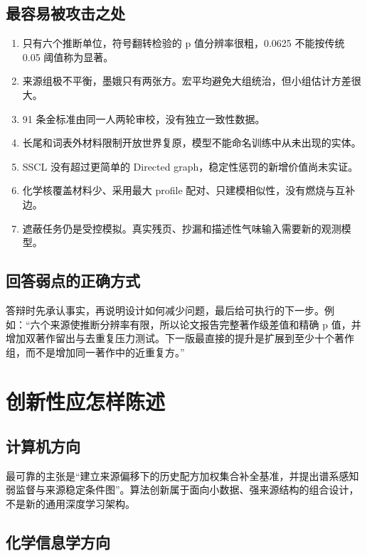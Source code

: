 \documentclass[UTF8,11pt,openany,fontset=none]{ctexbook}
\newcommand{\SSCL}{\textsc{SSCL}}
\begin{document}
\section{最容易被攻击之处}

\begin{enumerate}
\item 只有六个推断单位，符号翻转检验的 p 值分辨率很粗，0.0625 不能按传统 0.05 阈值称为显著。
\item 来源组极不平衡，墨娥只有两张方。宏平均避免大组统治，但小组估计方差很大。
\item 91 条金标准由同一人两轮审校，没有独立一致性数据。
\item 长尾和词表外材料限制开放世界复原，模型不能命名训练中从未出现的实体。
\item \SSCL{} 没有超过更简单的 Directed graph，稳定性惩罚的新增价值尚未实证。
\item 化学核覆盖材料少、采用最大 profile 配对、只建模相似性，没有燃烧与互补边。
\item 遮蔽任务仍是受控模拟。真实残页、抄漏和描述性气味输入需要新的观测模型。
\end{enumerate}

\section{回答弱点的正确方式}

答辩时先承认事实，再说明设计如何减少问题，最后给可执行的下一步。例如：“六个来源使推断分辨率有限，所以论文报告完整著作级差值和精确 p 值，并增加双著作留出与去重复压力测试。下一版最直接的提升是扩展到至少十个著作组，而不是增加同一著作中的近重复方。”

\chapter{创新性应怎样陈述}

\section{计算机方向}

最可靠的主张是“建立来源偏移下的历史配方加权集合补全基准，并提出谱系感知弱监督与来源稳定条件图”。算法创新属于面向小数据、强来源结构的组合设计，不是新的通用深度学习架构。

\section{化学信息学方向}
\end{document}
